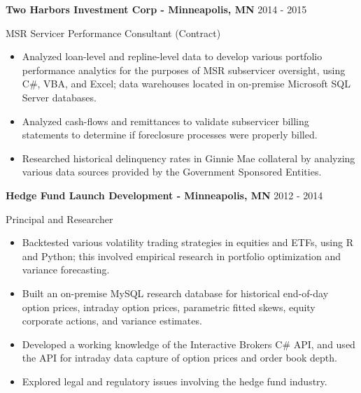 \documentclass[11pt,a4paper,]{awesome-cv}
\begin{document}
\normalsize

\textbf{Two Harbors Investment Corp - Minneapolis, MN } \hfill 2014 -
2015

\vspace{-1ex}

MSR Servicer Performance Consultant (Contract)

\vspace{-1.5ex}

\small

\begin{itemize}
\item
  Analyzed loan-level and repline-level data to develop various
  portfolio performance analytics for the purposes of MSR subservicer
  oversight, using C\#, VBA, and Excel; data warehouses located in
  on-premise Microsoft SQL Server databases. \vspace{-0.5ex}
\item
  Analyzed cash-flows and remittances to validate subservicer billing
  statements to determine if foreclosure processes were properly billed.
  \vspace{-0.5ex}
\item
  Researched historical delinquency rates in Ginnie Mae collateral by
  analyzing various data sources provided by the Government Sponsored
  Entities. \vspace{-0.5ex}
\end{itemize}

\normalsize

\textbf{Hedge Fund Launch Development - Minneapolis, MN } \hfill 2012 -
2014

\vspace{-1ex}

Principal and Researcher

\vspace{-1.5ex}

\small

\begin{itemize}
\item
  Backtested various volatility trading strategies in equities and ETFs,
  using R and Python; this involved empirical research in portfolio
  optimization and variance forecasting. \vspace{-0.5ex}
\item
  Built an on-premise MySQL research database for historical end-of-day
  option prices, intraday option prices, parametric fitted skews, equity
  corporate actions, and variance estimates. \vspace{-0.5ex}
\item
  Developed a working knowledge of the Interactive Brokers C\# API, and
  used the API for intraday data capture of option prices and order book
  depth. \vspace{-0.5ex}
\item
  Explored legal and regulatory issues involving the hedge fund
  industry.
\end{itemize}
\end{document}
